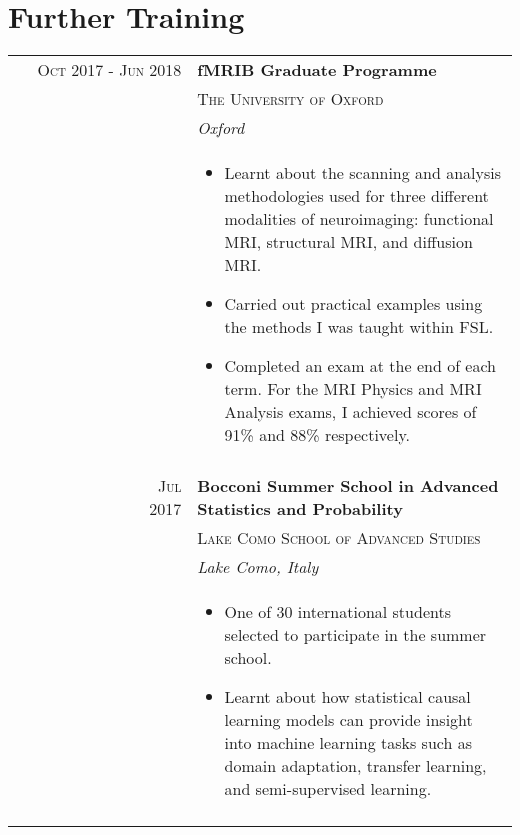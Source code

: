 \documentclass[a4paper,10pt]{article}
\begin{document}
\section{Further Training}
\begin{tabular}{rl}
\textsc{Oct} 2017 - \textsc{Jun} 2018
& \large{\textbf{fMRIB Graduate Programme}}\\
& \textsc{The University of Oxford}\\
& \textit{Oxford} \\
&\begin{minipage}[t]{0.8\textwidth}
 \begin{itemize}[leftmargin=*]
 \item Learnt about the scanning and analysis methodologies used for three different modalities of neuroimaging: functional MRI, structural MRI, and diffusion MRI. 
 \item Carried out practical examples using the methods I was taught within FSL. 
 \item Completed an exam at the end of each term. For the MRI Physics and MRI Analysis exams, I achieved scores of 91\% and 88\% respectively. 
 \end{itemize}
\end{minipage}\\&\\

\ \ \ \ \ \ \ \ \ \ \ \ \ \ \ \ \ \textsc{Jul} 2017
& \large{\textbf{Bocconi Summer School in Advanced Statistics and Probability}}\\
& \textsc{Lake Como School of Advanced Studies}\\
& \textit{Lake Como, Italy} \\
&\begin{minipage}[t]{0.8\textwidth}
 \begin{itemize}[leftmargin=*]
 \item One of 30 international students selected to participate in the summer school.   
 \item Learnt about how statistical causal learning models can provide insight into machine learning tasks such as domain adaptation, transfer learning, and semi-supervised learning. 
\end{itemize}
\end{minipage}\\&\\


\end{tabular}
\end{document}
